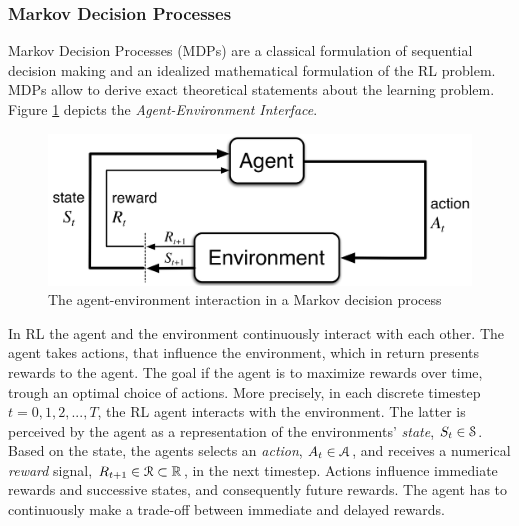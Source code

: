 \documentclass[a4paper, twoside, 12pt]{article}
\let\cite\shortcite
\begin{document}
\subsubsection{Markov Decision Processes}
\label{sec:org19645b0}
Markov Decision Processes (MDPs) are a classical formulation of sequential
decision making and an idealized mathematical formulation of the RL problem. MDPs
allow to derive exact theoretical statements about the learning problem. Figure
\ref{agent-environment-interaction} depicts the \emph{Agent-Environment Interface}.
\begin{figure}[htbp]
\centering
\includegraphics[width=.9\linewidth]{./fig/mdp_interaction.png}
\caption[Markov Decision Process]{The agent-environment interaction in a Markov decision process \cite{sutton18_reinf} \label{agent-environment-interaction}}
\end{figure}
In RL the agent and the environment continuously interact with each other. The
agent takes actions, that influence the environment, which in return presents
rewards to the agent. The goal if the agent is to maximize rewards over time,
trough an optimal choice of actions. More precisely, in each discrete timestep
\(t=0,1,2,...,T\), the RL agent interacts with the environment. The latter is
perceived by the agent as a representation of the environments' \emph{state}, \(S_t
\in \S\). Based on the state, the agents selects an \emph{action}, \(A_t\in\A\), and
receives a numerical \emph{reward} signal, \(R_{t+1}\in\R\subset\Re\), in the next
timestep. Actions influence immediate rewards and successive states, and
consequently future rewards. The agent has to continuously make a trade-off
between immediate and delayed rewards.
\end{document}
